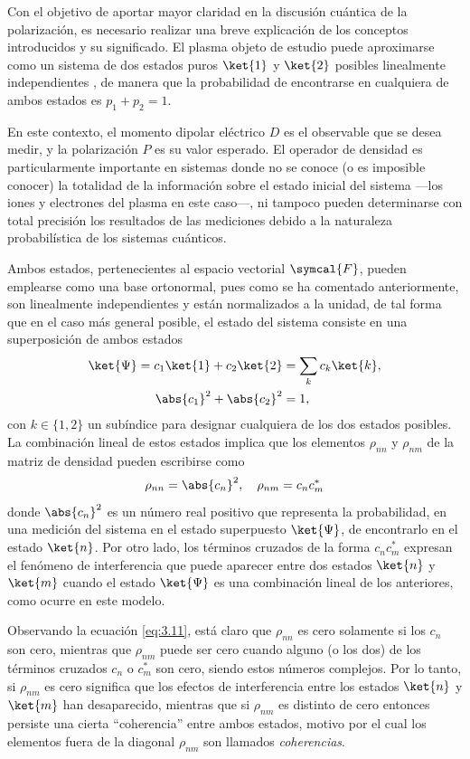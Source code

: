 Con el objetivo de aportar mayor claridad en la discusión cuántica de la polarización, es necesario realizar una breve explicación de los conceptos introducidos y su significado. El plasma objeto de estudio puede aproximarse \autocite{Milonni1988} como un sistema de dos estados puros $\ket{1}$ y $\ket{2}$ posibles linealmente independientes \autocite{Cohen-Tannoudji2019}, de manera que la probabilidad de encontrarse en cualquiera de ambos estados es $p_{1} + p_{2} = 1$.

En este contexto, el momento dipolar eléctrico $D$ es el observable que se desea medir, y la polarización $P$ es su valor esperado. El operador de densidad es particularmente importante en sistemas donde no se conoce (o es imposible conocer) la totalidad de la información sobre el estado inicial del sistema ---los iones y electrones del plasma en este caso---, ni tampoco pueden determinarse con total precisión los resultados de las mediciones debido a la naturaleza probabilística de los sistemas cuánticos. 

Ambos estados, pertenecientes al espacio vectorial $\symcal{F}$, pueden emplearse como una base ortonormal, pues como se ha comentado anteriormente, son linealmente independientes y están normalizados a la unidad, de tal forma que en el caso más general posible, el estado del sistema consiste en una superposición de ambos estados
\begin{align}
  \ket{\Psi} = c_{1}\ket{1} + c_{2}\ket{2} &= \sum_{k} c_{k}\ket{k}, \\
  \abs{c_{1}}^{2} + \abs{c_{2}}^{2} &= 1,
\end{align}
con $k \in \{1,2\}$ un subíndice para designar cualquiera de los dos estados posibles. La combinación lineal de estos estados implica que los elementos $\rho_{nn}$ y $\rho_{nm}$ de la matriz de densidad pueden escribirse como
\begin{equation}\label{eq:3.11}
  \rho_{nn} = \abs{c_{n}}^{2}, \quad 
  \rho_{nm} = c_{n}c^{*}_{m}
\end{equation}
donde $\abs{c_{n}}^{2}$ es un número real positivo que representa la probabilidad, en una medición del sistema en el estado superpuesto $\ket{\Psi}$, de encontrarlo en el estado $\ket{n}$. Por otro lado, los términos cruzados de la forma $c_{n}c^{*}_{m}$ expresan el fenómeno de interferencia que puede aparecer entre dos estados $\ket{n}$ y $\ket{m}$ cuando el estado $\ket{\Psi}$ es una combinación lineal de los anteriores, como ocurre en este modelo. 

Observando la ecuación \eqref{eq:3.11}, está claro que $\rho_{nn}$ es cero solamente si los $c_{n}$ son cero, mientras que $\rho_{nm}$ puede ser cero cuando alguno (o los dos) de los términos cruzados $c_{n}$ o $c^{*}_{m}$ son cero, siendo estos números complejos. Por lo tanto, si $\rho_{nm}$ es cero significa que los efectos de interferencia entre los estados $\ket{n}$ y $\ket{m}$ han desaparecido, mientras que si $\rho_{nm}$ es distinto de cero entonces persiste una cierta \enquote{coherencia} entre ambos estados, motivo por el cual los elementos fuera de la diagonal $\rho_{nm}$ son llamados \emph{coherencias}.

